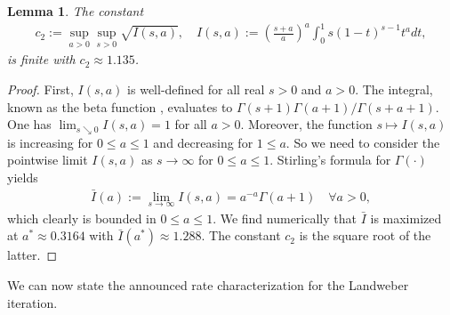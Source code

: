 \documentclass[10pt, a4paper]{iopart}
\newtheorem{lemma}{Lemma}[section]
\theoremstyle{remark}
\theoremstyle{definition}
\begin{document}
\begin{lemma}
\label{l:c2}
	The constant 
	\begin{align}
	\label{e:c2}
		c_2
		:=
		\sup_{a > 0}
		\sup_{s > 0}
		\sqrt{ I(s, a) },
		\quad
		I(s, a)
		:=
		\left(
			\frac{ s + a }{ a }
		\right)^a
		\int_0^1 s (1 - t)^{s-1} t^{a} dt,
	\end{align}
	is finite
	with
	$c_2 \approx 1.135$.
\end{lemma}
%
\begin{proof}
	First, $I(s, a)$ is well-defined
	for all real $s > 0$ and $a > 0$.
	The integral, 
	known as the beta function \cite[\S6.2]{AbramowitzStegun1972},
	evaluates to 
	$\Gamma(s+1) \Gamma(a+1) / \Gamma(s+a+1)$.
	One has $\lim_{s \searrow 0} I(s, a) = 1$ for all $a > 0$.
	Moreover,
	the function
	$s \mapsto I(s, a)$
	is increasing for $0 \leq a \leq 1$
	and
	decreasing for $1 \leq a$.
	So we need to consider 
	the pointwise limit $I(s, a)$ as $s \to \infty$
	for $0 \leq a \leq 1$.
	Stirling's formula \cite[\S6.1.38]{AbramowitzStegun1972} 
	for $\Gamma(\cdot)$ yields
	\begin{align}
		\label{e:soo}
		\bar{I}(a) := \lim_{s \to \infty} I(s, a) = a^{-a} \Gamma(a + 1)
		\quad
		\forall a > 0
		,
	\end{align}
	which clearly is bounded in $0 \leq a \leq 1$.
	We find
	numerically
	that
	$\bar{I}$ is maximized at $a^* \approx 0.3164$
	with $\bar{I}(a^*) \approx 1.288$.
	The constant $c_2$ is the square root of the latter.
\end{proof}

%

We can now state 
the
announced 
rate characterization for 
the Landweber iteration.

%
\end{document}
